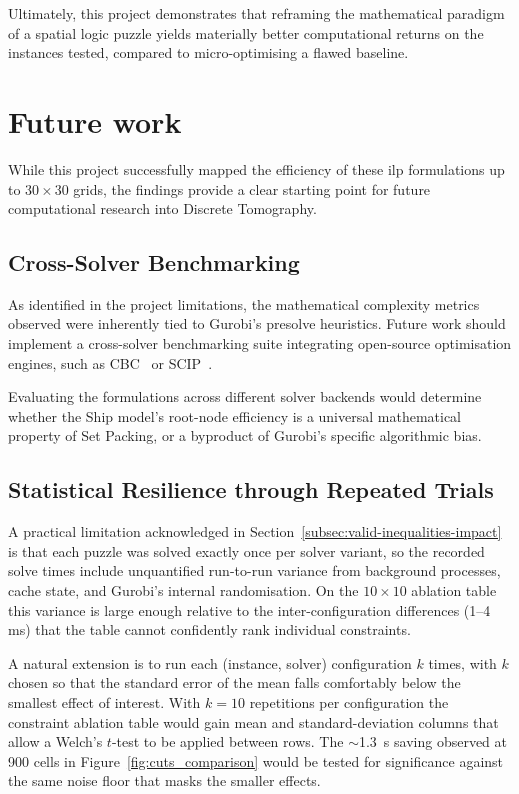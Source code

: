 Ultimately, this project demonstrates that reframing the mathematical paradigm of a spatial logic puzzle yields materially better computational returns on the instances tested, compared to micro-optimising a flawed baseline.

\section{Future work}\label{sec:future}

While this project successfully mapped the efficiency of these \gls{ilp} formulations up to $30 \times 30$ grids, the findings provide a clear starting point for future computational research into Discrete Tomography.

\subsection{Cross-Solver Benchmarking}\label{subsec:cross-solver-benchmarking}
As identified in the project limitations, the mathematical complexity metrics observed were inherently tied to Gurobi's presolve heuristics. Future work should implement a cross-solver benchmarking suite integrating open-source optimisation engines, such as CBC~\citep{coin-orcbc} or SCIP~\citep{achterberg2009scip}.

Evaluating the formulations across different solver backends would determine whether the Ship model's root-node efficiency is a universal mathematical property of Set Packing, or a byproduct of Gurobi's specific algorithmic bias.

\subsection{Statistical Resilience through Repeated Trials}\label{subsec:statistical-resilience}
A practical limitation acknowledged in Section~\ref{subsec:valid-inequalities-impact} is that each puzzle was solved exactly once per solver variant, so the recorded solve times include unquantified run-to-run variance from background processes, cache state, and Gurobi's internal randomisation. On the $10 \times 10$ ablation table this variance is large enough relative to the inter-configuration differences (1--4\,ms) that the table cannot confidently rank individual constraints.

A natural extension is to run each (instance, solver) configuration $k$ times, with $k$ chosen so that the standard error of the mean falls comfortably below the smallest effect of interest. With $k = 10$ repetitions per configuration the constraint ablation table would gain mean and standard-deviation columns that allow a Welch's $t$-test to be applied between rows. The $\sim$\SI{1.3}{\second} saving observed at \num{900} cells in Figure~\ref{fig:cuts_comparison} would be tested for significance against the same noise floor that masks the smaller effects.


